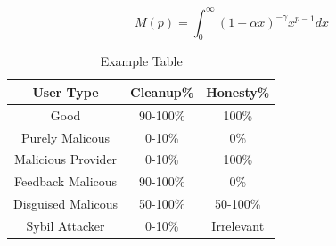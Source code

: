 \documentclass{sig-alternate}
\begin{document}
\begin{equation}
M(p) = \int^\infty_0 (1+\alpha x)^{-\gamma}x^{p-1}dx
\label{eqn:some_equation}
\end{equation}


\begin{table}[htb!]
	\begin{center}
  \begin{tabular}{| c | c | c |}
    \hline
    \textbf{User Type} & \textbf{Cleanup\%} & \textbf{Honesty\%} \\ \hline
    Good & 90-100\% & 100\% \\ \hline
    Purely Malicous & 0-10\% & 0\% \\ \hline
		Malicious Provider & 0-10\% & 100\% \\ \hline
		Feedback Malicous & 90-100\% & 0\% \\ \hline
		Disguised Malicous & 50-100\% & 50-100\% \\ \hline
		Sybil Attacker & 0-10\% & Irrelevant \\ \hline
  \end{tabular}
	\caption{Example Table}
  \label{tab:some_table}
	\vspace{-10pt}
	\end{center}
\end{table}
\end{document}
